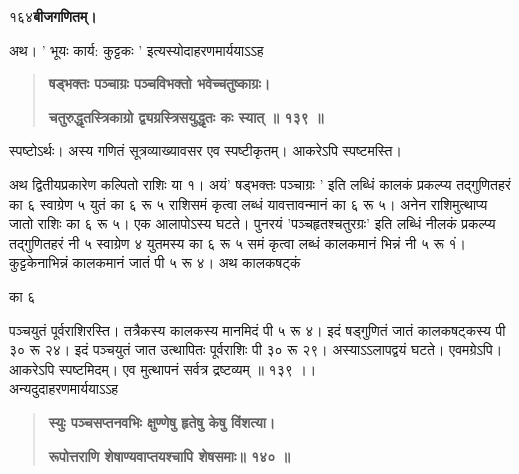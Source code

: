 \documentclass[11pt, openany]{book}
\begin{document}
\onehalfspacing
१६४\hspace{2in}\textbf{बीजगणितम्।} 

\vspace{5mm}

\begin{sloppypar}

\hangindent=0.2in \hspace{0.2in}अथ। ' भूयः कार्य: कुट्टकः ' इत्यस्योदाहरणमार्ययाऽऽह\textendash

\begin{quote}
\hspace{1in}\textbf{षड्भक्तः पञ्चाग्रः पञ्चविभक्तो भवेच्चतुष्काग्रः।}

\hspace{1in}\textbf{चतुरुद्धृतस्त्रिकाग्रो द्व्यग्रस्त्रिसयुद्धृतः कः स्यात् ॥ १३९ ॥}
\end{quote}

\hangindent=0.2in \hspace{0.2in}स्पष्टोऽर्थः। अस्य गणितं सूत्रव्याख्यावसर एव स्पष्टीकृतम्। आकरेऽपि स्पष्टमस्ति।

\hangindent=0.2in \hspace{0.2in}अथ द्वितीयप्रकारेण कल्पितो राशिः या १। अयं' षड्भक्तः पञ्चाग्रः ' इति लब्धिं कालकं प्रकल्प्य तद्गुणितहरं का ६ स्वाग्रेण ५ युतं का ६ रू ५ राशिसमं कृत्वा लब्धं यावत्तावन्मानं का ६ रू ५। अनेन राशिमुत्थाप्य जातो राशिः का ६ रू ५। एक आलापोऽस्य घटते। पुनरयं 'पञ्चहृतश्चतुरग्रः' इति लब्धिं नीलकं प्रकल्प्य तद्गुणितहरं नी ५ स्वाग्रेण ४ युतमस्य का ६ रू ५ समं कृत्वा लब्धं कालकमानं भिन्नं नी ५ रू १ं। कुट्टकेनाभिन्नं कालकमानं जातं पी ५ रू ४। अथ कालकषट्कं

\hspace{1.05in}का ६

\hangindent=0.2in पञ्चयुतं पूर्वराशिरस्ति। तत्रैकस्य कालकस्य मानमिदं पी ५ रू ४। इदं षड्गुणितं जातं कालकषट्कस्य पी ३० रू २४। इदं पञ्चयुतं जात उत्थापितः पूर्वराशिः पी ३० रू २९। अस्याऽऽलापद्वयं घटते। एवमग्रेऽपि। आकरेऽपि स्पष्टमिदम्। एव मुत्थापनं सर्वत्र द्रष्टव्यम् ॥ १३९ ।।\\

\hangindent=0.2in \hspace{0.2in}अन्यदुदाहरणमार्ययाऽऽह\textendash

\begin{quote}
\hspace{1in}\textbf{स्युः पञ्चसप्तनवभिः क्षुण्णेषु हृतेषु केषु विंशत्या।}

\hspace{1in}\textbf{रूपोत्तराणि शेषाण्यवाप्तयश्चापि शेषसमाः॥ १४० ॥}
\end{quote}


\end{sloppypar}
\end{document}
